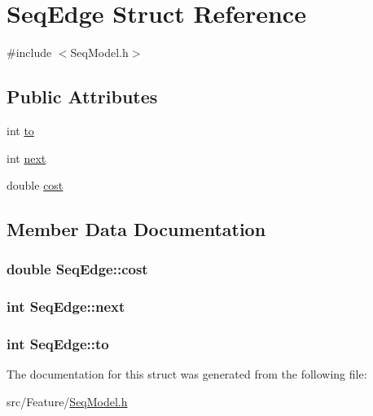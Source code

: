 \hypertarget{struct_seq_edge}{\section{Seq\+Edge Struct Reference}
\label{struct_seq_edge}
}


{\ttfamily \#include $<$Seq\+Model.\+h$>$}

\subsection*{Public Attributes}
\begin{DoxyCompactItemize}
\item 
int \hyperlink{struct_seq_edge_a818e5eebfe2b1c574481270feff3eb03}{to}
\item 
int \hyperlink{struct_seq_edge_aa862cd7c6fd2d8b6bc4a48766bc1b4f2}{next}
\item 
double \hyperlink{struct_seq_edge_a7bf5b4558efd51b94a4dd4c80a2294bd}{cost}
\end{DoxyCompactItemize}


\subsection{Member Data Documentation}
\hypertarget{struct_seq_edge_a7bf5b4558efd51b94a4dd4c80a2294bd}{
\subsubsection[{cost}]{\setlength{\rightskip}{0pt plus 5cm}double Seq\+Edge\+::cost}}\label{struct_seq_edge_a7bf5b4558efd51b94a4dd4c80a2294bd}
\hypertarget{struct_seq_edge_aa862cd7c6fd2d8b6bc4a48766bc1b4f2}{
\subsubsection[{next}]{\setlength{\rightskip}{0pt plus 5cm}int Seq\+Edge\+::next}}\label{struct_seq_edge_aa862cd7c6fd2d8b6bc4a48766bc1b4f2}
\hypertarget{struct_seq_edge_a818e5eebfe2b1c574481270feff3eb03}{
\subsubsection[{to}]{\setlength{\rightskip}{0pt plus 5cm}int Seq\+Edge\+::to}}\label{struct_seq_edge_a818e5eebfe2b1c574481270feff3eb03}


The documentation for this struct was generated from the following file\+:\begin{DoxyCompactItemize}
\item 
src/\+Feature/\hyperlink{_seq_model_8h}{Seq\+Model.\+h}\end{DoxyCompactItemize}
